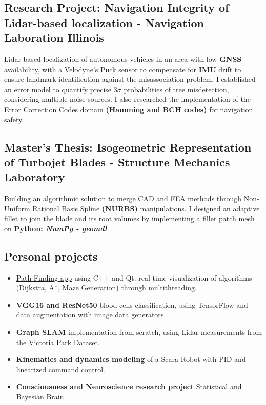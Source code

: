 \documentclass[]{article}
\begin{document}
\subsection{Research Project: Navigation Integrity of Lidar-based localization - Navigation Laboration Illinois}
Lidar-based localization of autonomous vehicles in an area with low \textbf{GNSS} availability, with a Velodyne's Puck sensor to compensate for \textbf{IMU} drift to ensure landmark identification against the misassociation problem.
I established an error model to quantify precise $3\sigma $ probabilities of tree misdetection, considering multiple noise sources. 
I also researched the implementation of the Error Correction Codes domain \textbf{(Hamming and BCH codes)} for navigation safety.

\vspace{1ex}

\subsection{Master's Thesis: Isogeometric Representation of Turbojet Blades - Structure Mechanics Laboratory}
Building an algorithmic solution to merge CAD and FEA methods through Non-Uniform Rational Basis Spline \textbf{(NURBS)} manipulations. 
I designed an adaptive fillet to join the blade and its root volumes by implementing a fillet patch mesh on \textbf{Python: \textit{NumPy - geomdl}}.

\vspace{1ex}

\subsection{Personal projects}
\begin{itemize}
    \item \href{https://github.com/NathanTouboul/PathPlanning}{Path Finding app}  using C++ and Qt: real-time visualization of algorithms (Dijkstra, A*, Maze Generation) through multithreading.
    \item \textbf{VGG16 and ResNet50} blood cells classification, using TensorFlow and data augmentation with image data generators.
    \item \textbf{Graph SLAM} implementation from scratch, using Lidar measurements from the Victoria Park Dataset.
    \item \textbf{Kinematics and dynamics modeling} of a Scara Robot with PID and linearized command control.
    \item \textbf{Consciousness and Neuroscience research project} Statistical and Bayesian Brain.
\end{itemize}
\end{document}
